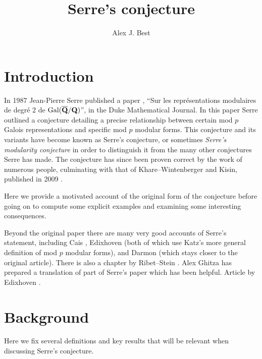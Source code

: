 \documentclass[a4paper,12pt]{article}
\title{Serre's conjecture\vspace{-14pt}}
\author{Alex J. Best}
\date{}
\begin{document}
\maketitle
\vspace{-50pt}
\tableofcontents
\clearpage


\section{Introduction}
In 1987 Jean-Pierre Serre published a paper \cite{Serre87}, ``Sur les repr\'esentations modulaires de degr\'e 2 de $\operatorname{Gal}(\overline{\mathbf{Q}}/\mathbf{Q})$'', in the Duke Mathematical Journal.
In this paper Serre outlined a conjecture detailing a precise relationship between certain mod $p$ Galois representations and specific mod $p$ modular forms.
This conjecture and its variants have become known as Serre's conjecture, or sometimes \emph{Serre's modularity conjecture} in order to distinguish it from the many other conjectures Serre has made.
The conjecture has since been proven correct by the work of numerous people, culminating with that of Khare--Wintenberger and Kisin, published in 2009 \cite{KWI,KWII,Kisin}.

Here we provide a motivated account of the original form of the conjecture before going on to compute some explicit examples and examining some interesting consequences.

Beyond the original paper there are many very good accounts of Serre's statement, including Cais \cite{Cais}, Edixhoven \cite{Edixhoven} (both of which use Katz's more general definition of mod $p$ modular forms), and Darmon \cite{Darmon} (which stays closer to the original article).
There is also a chapter by Ribet--Stein \cite{RibetStein}. %
Alex Ghitza has prepared a translation of part of Serre's paper \cite{Ghitza} which has been helpful.
Article by Edixhoven \cite{EdixhovenWeight}.


\section{Background}
Here we fix several definitions and key results that will be relevant when discussing Serre's conjecture.
\end{document}
